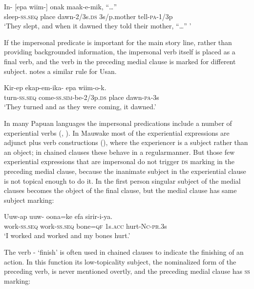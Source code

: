 \ea%
\label{ex:8:x1475}
\gll In-  [epa  wiim-]  onak  maak-e-mik,  ``{\dots''}\\
sleep-\textsc{ss}.\textsc{seq} place dawn-2/3s.\textsc{ds} 3s/p.mother  tell-\textsc{pa}-1/3p\\
\glt`They slept, and when it dawned they told their mother, ``{\dots}'' '
\z


If the impersonal predicate is important for the main story line, rather than providing backgrounded information, the impersonal verb itself is placed as a final verb, and the verb in the preceding medial clause is marked for different subject. \citet[206]{Reesink1987} notes a similar rule for Usan. 

\ea%
\label{ex:8:x1492}
\gll Kir-ep  ekap-em-ika-  epa  wiim-o-k. \\
turn-\textsc{ss}.\textsc{seq} come-\textsc{ss}.\textsc{sim}-be-2/3p.\textsc{ds} place dawn-\textsc{pa}-3s\\
\glt`They turned and as they were coming, it dawned.'
\z


In many Papuan languages the impersonal predications include a number of experiential verbs (\citealt[204]{Reesink1987}, \citealt{Roberts1997}). In Mauwake most of the experiential expressions are adjunct plus verb constructions (), where the experiencer is a subject rather than an object; in chained clauses these behave in a regular\textstyleAcronymallcaps manner. But those few experiential expressions that are impersonal do not trigger \textsc{ds} marking in the preceding medial clause, because the inanimate subject in the experiential clause is not topical enough to do it. In  the first person singular subject of the medial clauses becomes the object of the final clause, but the medial clause has same subject marking:

\ea%
\label{ex:8:x1491}
\gll Uuw-ap uuw- oona=ke efa  sirir-i-ya.\\
work-\textsc{ss}.\textsc{seq} work-\textsc{ss}.\textsc{seq} bone=\textsc{qf} 1s.\textsc{acc} hurt-\textsc{Nc}-\textsc{pr}.3s\\
\glt`I worked and worked and my bones hurt.'
\z


The verb - `finish' is often used in chained clauses to indicate the finishing of an action. In this function its low-topicality subject, the nominalized form of the preceding verb, is never mentioned overtly, and the preceding medial clause has \textsc{ss} marking:

